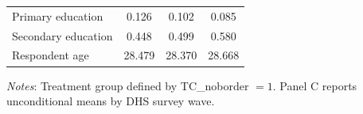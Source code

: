 \documentclass[12pt,a4paper]{article}
\begin{document}
\begin{table}[H]
\begin{threeparttable}
\begin{tabular}{@{}lcccccc@{}}
Primary education      & \multicolumn{2}{c}{0.126} & \multicolumn{2}{c}{0.102} & \multicolumn{2}{c}{0.085} \\
Secondary education    & \multicolumn{2}{c}{0.448} & \multicolumn{2}{c}{0.499} & \multicolumn{2}{c}{0.580} \\
Respondent age         & \multicolumn{2}{c}{28.479} & \multicolumn{2}{c}{28.370} & \multicolumn{2}{c}{28.668} \\
\bottomrule
\end{tabular}
\begin{tablenotes}[flushleft]
\footnotesize
\item \textit{Notes}: Treatment group defined by TC\_noborder $= 1$. Panel C reports unconditional means by DHS survey wave.
\end{tablenotes}
\end{threeparttable}
\end{table}
\end{document}
